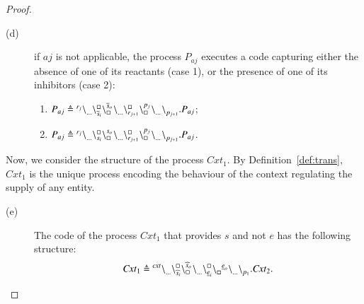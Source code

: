 \begin{proof}
\begin{description}
\item[(d)] 
 if $aj$ is not applicable,
the process $P_{aj}$ executes a code  capturing either the absence of one of its reactants (case 1), or the presence  of one of its inhibitors (case 2):
\begin{enumerate}
\item $P_{aj}\triangleq {}^{r_j} \backslash_{\dots}^{}\backslash_{\overline{s}_i}^{\scriptstyle {\square}}\backslash_{\scriptstyle {\square}}^{\overline{s}_o}{}^{} \backslash_{\dots}^{} \backslash_{r_{j+1}}^{\scriptstyle {\square}}\backslash_{\scriptstyle {\square}}^{p_j}{}^{} \backslash_{\dots}^{}{}^{} \backslash_{p_{j+1}}^{}.P_{aj} $;
\item $P_{aj}\triangleq {}^{r_j} \backslash_{\dots}^{}\backslash_{s_i}^{\scriptstyle {\square}}\backslash_{\scriptstyle {\square}}^{s_o}{}^{} \backslash_{\dots}^{} \backslash_{r_{j+1}}^{\scriptstyle {\square}}\backslash_{\scriptstyle {\square}}^{p_j}{}^{} \backslash_{\dots}^{}{}^{} \backslash_{p_{j+1}}^{} .P_{aj}$.
\end{enumerate}
\end{description}
Now, we consider the structure of the process $\mathit{Cxt}_1$. 
By Definition~\ref{def:trans}, $Cxt_1$ is the unique process encoding the behaviour of the context regulating the supply of any entity. 

\begin{description}
\item[(e)] 
The code of the process $Cxt_1$ that provides $s$ and not $e$ has the following structure: 
$$
\mathit{Cxt}_1 \triangleq
{}^{\mathit{cxt}} \backslash_{\dots}^{}
\backslash_{\widehat{s}_i}^{\scriptstyle {\square}}\backslash_{\scriptstyle {\square}}^{\widehat{s}_o}{}^{} \backslash_{\dots}^{} 
\backslash_{\underline{e}_i}^{\scriptstyle {\square}}\backslash_{\scriptstyle {\square}}^{}{}^{\underline{e}_o} \backslash_{\dots}^{} 
\backslash_{p_{1}}^{}. \mathit{Cxt}_{2} .
$$
\end{description}



\end{proof}
